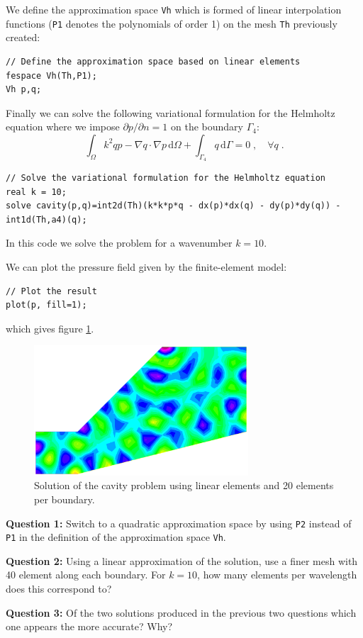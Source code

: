 \documentclass[english,3p]{elsarticle}
\newcommand{\code}[1]{\texttt{#1}}
\newcommand{\dd}{\mathrm{d}}
\begin{document}
We define the approximation space \code{Vh} which is formed of linear interpolation functions (\code{P1} denotes the polynomials of order 1) on the mesh \code{Th} previously created:
\begin{lstlisting}
// Define the approximation space based on linear elements
fespace Vh(Th,P1);
Vh p,q;
\end{lstlisting}

Finally we can solve the following variational formulation for the Helmholtz equation where we impose $\partial p/\partial n=1$ on the boundary $\Gamma_4$:
$$
\int_\Omega k^2qp - \nabla q\cdot\nabla p\,\dd\Omega+
\int_{\Gamma_4} q\,\dd\Gamma
=0
\;,\quad
\forall q
\;.
$$
\begin{lstlisting}
// Solve the variational formulation for the Helmholtz equation
real k = 10;
solve cavity(p,q)=int2d(Th)(k*k*p*q - dx(p)*dx(q) - dy(p)*dy(q)) - int1d(Th,a4)(q);
\end{lstlisting}
In this code we solve the problem for a wavenumber $k=10$.

We can plot the pressure field given by the finite-element model:
\begin{lstlisting}
// Plot the result
plot(p, fill=1);
\end{lstlisting}
which gives figure \ref{fig:solution1}.
\begin{figure}[h]
\centering
\includegraphics[width=80mm]{solution_P1.eps}
\caption{Solution of the cavity problem using linear elements and 20 elements per boundary.}
\label{fig:solution1}
\end{figure}

\textbf{Question 1:} Switch to a quadratic approximation space by using \code{P2} instead of \code{P1} in the definition of the approximation space \code{Vh}.

\textbf{Question 2:} Using a linear approximation of the solution, use a finer mesh with 40 element along each boundary.
For $k=10$, how many elements per wavelength does this correspond to?

\textbf{Question 3:} Of the two solutions produced in the previous two questions which one appears the more accurate? Why?
\end{document}
